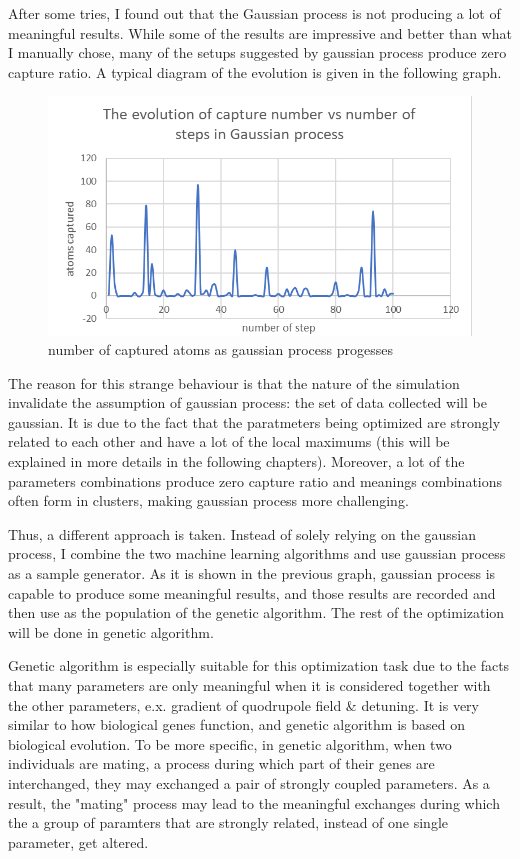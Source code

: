 \documentclass{article}
\begin{document}
After some tries, I found out that the Gaussian process is not producing a lot of meaningful results. While some of the results are impressive and better than what I manually chose, many of the setups suggested by gaussian process produce zero capture ratio. A typical diagram of the evolution is given in the following graph.
\begin{figure}
	\includegraphics[width=\columnwidth]{GP.png}
	\caption{number of captured atoms as gaussian process progesses}
\end{figure}

The reason for this strange behaviour is that the nature of the simulation invalidate the assumption of gaussian process: the set of data collected will be gaussian. It is due to the fact that the paratmeters being optimized are strongly related to each other and have a lot of the local maximums (this will be explained in more details in the following chapters). Moreover, a lot of the parameters combinations produce zero capture ratio and meanings combinations often form in clusters, making gaussian process more challenging.

Thus, a different approach is taken. Instead of solely relying on the gaussian process, I combine the two machine learning algorithms and use gaussian process as a sample generator. As it is shown in the previous graph, gaussian process is capable to produce some meaningful results, and those results are recorded and then use as the population of the genetic algorithm. The rest of the optimization will be done in genetic algorithm.

Genetic algorithm is especially suitable for this optimization task due to the facts that many parameters are only meaningful when it is considered together with the other parameters, e.x. gradient of quodrupole field & detuning. It is very similar to how biological genes function, and  genetic algorithm is based on biological evolution. To be more specific, in genetic algorithm, when two individuals are mating, a process during which part of their genes are interchanged, they may exchanged a pair of strongly coupled parameters. As a result, the "mating" process may lead to the meaningful exchanges during which the a group of paramters that are strongly related, instead of one single parameter, get altered.

\end{document}
